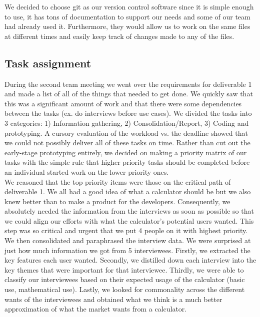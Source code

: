 \documentclass[a4paper]{article}
\begin{document}
We decided to choose git as our version control software since it is simple enough to use, it has tons of documentation to support our needs and some of our team had already used it. Furthermore, they would allow us to work on the same files at different times and easily keep track of changes made to any of the files. 

\subsection{Task assignment}

During the second team meeting we went over the requirements for deliverable 1 and made a list of all of the things that needed to get done. We quickly saw that this was a significant amount of work and that there were some dependencies between the tasks (ex. do interviews before use cases). We divided the tasks into 3 categories: 1) Information gathering, 2) Consolidation/Report, 3) Coding and prototyping. A cursory evaluation of the workload vs. the deadline showed that we could not possibly deliver all of these tasks on time. Rather than cut out the early-stage prototyping entirely, we decided on making a priority matrix of our tasks with the simple rule that higher priority tasks should be completed before an individual started work on the lower priority ones. \\

We reasoned that the top priority items were those on the critical path of deliverable 1. We all had a good idea of what a calculator should be but we also knew better than to make a product for the developers. Consequently, we absolutely needed the information from the interviews as soon as possible so that we could align our efforts with what the calculator's potential users wanted. This step was so critical and urgent that we put 4 people on it with highest priority. \\

We then consolidated and paraphrased the interview data. We were surprised at just how much information we got from 5 interviewees. Firstly, we extracted the key features each user wanted. Secondly, we distilled down each interview into the key themes that were important for that interviewee. Thirdly, we were able to classify our interviewees based on their expected usage of the calculator (basic use, mathematical use). Lastly, we looked for commonality across the different wants of the interviewees and obtained what we think is a much better approximation of what the market wants from a calculator. \\
\end{document}
